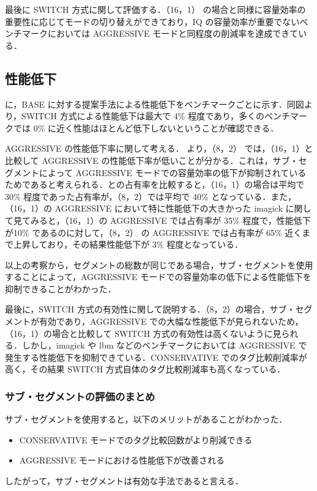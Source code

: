 最後に SWITCH 方式に関して評価する．（16，1） の場合と同様に容量効率の重要性に応じてモードの切り替えができており，IQ の容量効率が重要でないベンチマークにおいては AGGRESSIVE モードと同程度の削減率を達成できている．

\subsection{性能低下}
に，BASE に対する提案手法による性能低下をベンチマークごとに示す．同図より，SWITCH 方式による性能低下は最大で 4\% 程度であり，多くのベンチマークでは 0\% に近く性能はほとんど低下しないということが確認できる．

AGGRESSIVE の性能低下率に関して考える． より，（8，2） では，（16，1）と比較して AGGRESSIVE の性能低下率が低いことが分かる．これは，サブ・セグメントによって AGGRESSIVE モードでの容量効率の低下が抑制されているためであると考えられる．との占有率を比較すると，（16，1）の場合は平均で 30\% 程度であった占有率が，（8，2）では平均で 40\% となっている．また，（16，1）の AGGRESSIVE において特に性能低下の大きかった imagick に関して見てみると，（16，1）の AGGRESSIVE では占有率が 35\% 程度で，性能低下が10\% であるのに対して，（8，2） の AGGRESSIVE では占有率が 65\% 近くまで上昇しており，その結果性能低下が 3\% 程度となっている．

以上の考察から，セグメントの総数が同じである場合，サブ・セグメントを使用することによって，AGGRESSIVE モードでの容量効率の低下による性能低下を抑制できることがわかった．

最後に，SWITCH 方式の有効性に関して説明する．（8，2）の場合，サブ・セグメントが有効であり，AGGRESSIVE での大幅な性能低下が見られないため，（16，1）の場合と比較して SWITCH 方式の有効性は高くないように見られる．しかし，imagick や lbm などのベンチマークにおいては AGGRESSIVE で発生する性能低下を抑制できている．CONSERVATIVE でのタグ比較削減率が高く，その結果 SWITCH 方式自体のタグ比較削減率も高くなっている．

\subsubsection{サブ・セグメントの評価のまとめ}
サブ・セグメントを使用すると，以下のメリットがあることがわかった．
\begin{itemize}
  \item CONSERVATIVE モードでのタグ比較回数がより削減できる
  \item AGGRESSIVE モードにおける性能低下が改善される
\end{itemize}
したがって，サブ・セグメントは有効な手法であると言える．


